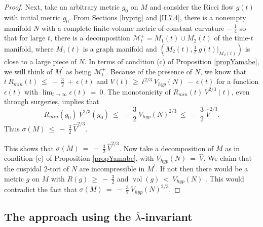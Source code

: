 \documentclass[12pt]{amsart}
\newcommand{\M}{{\mathcal M}}
\newcommand{\vol}{\operatorname{vol}}
\numberwithin{equation}{section}
\theoremstyle{plain}
\theoremstyle{definition}
\theoremstyle{remark}
\begin{document}
\begin{proof}
Next, take an arbitrary metric
$g_0$ on $M$ and consider the Ricci flow $g(t)$ with initial metric $g_0$.
From Sections \ref{hyprig} and  \ref{II.7.4}, there is a nonempty
manifold $N$ with a complete finite-volume metric
of constant curvature $- \: \frac14$
so that for large $t$, there is a decomposition $\M^+_t = M_1(t) \cup M_2(t)$ of the time-$t$ manifold,
where $M_1(t)$ is a graph manifold and $(M_2(t), \frac{1}{t} \: g(t) \big|_{M_2(t)})$
is close to a large
piece of $N$. In terms of condition (c) of Proposition \ref{propYamabe}, we will think
of $M^\prime$ as being $\M^+_t$.
Because of the presence of $N$, we know that $t \: R_{min}(t) \: \le \: - \:
\frac32 \: + \: \epsilon(t)$ and
$V(t) \: \ge \:
t^{2/3} \: V_{hyp}(N) \: - \: \epsilon(t)$ for a function $\epsilon(t)$ 
with $\lim_{t \rightarrow \infty}
\epsilon(t) \: = \: 0$. The monotonicity of
$R_{min}(t) \: V^{2/3}(t)$, even through surgeries, implies that
\begin{equation}
R_{min}(g_0) \: V^{2/3}(g_0) \: \le \: - \: \frac32 \: V_{hyp}(N)^{2/3}
 \: \le \: - \: \frac32 \: \widehat{V}^{2/3}.
 \end{equation}
Thus $\sigma(M) \: \le \: - \: \frac32 \: \widehat{V}^{2/3}$.

This shows that 
$\sigma(M) \: = \: - \: \frac32 \: \widehat{V}^{2/3}$.
Now take a decomposition of $M$ as in
condition (c) of Proposition \ref{propYamabe}, with
$V_{hyp}(N) \: = \: \widehat{V}$. We claim that the cuspidal $2$-tori of $N$
are incompressible in $M^\prime$. If not 
then there would be a metric  $g$ on $M$ with $R(g) \: \ge \: - \: \frac32$ and
$\vol(g) \: < \: V_{hyp}(N)$ \cite[Pf. of Theorem 2.9]{Anderson}. 
This would contradict the fact that  
$\sigma(M) \: = \: - \: \frac32 \: V_{hyp}(N)^{2/3}$.
\end{proof}

\subsection{The approach using the $\overline{\lambda}$-invariant}
\end{document}
